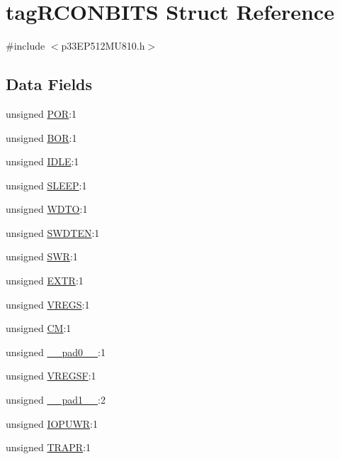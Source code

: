 \hypertarget{structtag_r_c_o_n_b_i_t_s}{}\section{tag\+R\+C\+O\+N\+B\+I\+TS Struct Reference}
\label{structtag_r_c_o_n_b_i_t_s}


{\ttfamily \#include $<$p33\+E\+P512\+M\+U810.\+h$>$}

\subsection*{Data Fields}
\begin{DoxyCompactItemize}
\item 
unsigned \hyperlink{structtag_r_c_o_n_b_i_t_s_ae99eb372a521d94f9df9f533ffa8a308}{P\+OR}\+:1
\item 
unsigned \hyperlink{structtag_r_c_o_n_b_i_t_s_afeb203c1042671be8f9582e0d3152b15}{B\+OR}\+:1
\item 
unsigned \hyperlink{structtag_r_c_o_n_b_i_t_s_abe9c5e7133050056afdce1c5cdf470cc}{I\+D\+LE}\+:1
\item 
unsigned \hyperlink{structtag_r_c_o_n_b_i_t_s_a9177ee67536822091725808bd8e80014}{S\+L\+E\+EP}\+:1
\item 
unsigned \hyperlink{structtag_r_c_o_n_b_i_t_s_a5698f00cd46c9f390b7bd90e441eab0c}{W\+D\+TO}\+:1
\item 
unsigned \hyperlink{structtag_r_c_o_n_b_i_t_s_ad336e4fd3e892bd5d33157de4abd75f4}{S\+W\+D\+T\+EN}\+:1
\item 
unsigned \hyperlink{structtag_r_c_o_n_b_i_t_s_aa9f213f01653d755c0eafd6a0ab848d3}{S\+WR}\+:1
\item 
unsigned \hyperlink{structtag_r_c_o_n_b_i_t_s_acd7d5c1d26c474898bda0b407876347a}{E\+X\+TR}\+:1
\item 
unsigned \hyperlink{structtag_r_c_o_n_b_i_t_s_acf721f1195338fc5901abd6e69edc2e1}{V\+R\+E\+GS}\+:1
\item 
unsigned \hyperlink{structtag_r_c_o_n_b_i_t_s_a0f69ed2f65fd91ba5109bc09fa02d8cf}{CM}\+:1
\item 
unsigned \hyperlink{structtag_r_c_o_n_b_i_t_s_adf71f3d8410c1f1dbbc96680a92c49af}{\+\_\+\+\_\+pad0\+\_\+\+\_\+}\+:1
\item 
unsigned \hyperlink{structtag_r_c_o_n_b_i_t_s_a467e9a0e3ce91cf31536ecb1d4b87bf3}{V\+R\+E\+G\+SF}\+:1
\item 
unsigned \hyperlink{structtag_r_c_o_n_b_i_t_s_acaf2d0924a107ec6e8d2e31febaf66f9}{\+\_\+\+\_\+pad1\+\_\+\+\_\+}\+:2
\item 
unsigned \hyperlink{structtag_r_c_o_n_b_i_t_s_afd207308cfa40af963365c79085f869e}{I\+O\+P\+U\+WR}\+:1
\item 
unsigned \hyperlink{structtag_r_c_o_n_b_i_t_s_ab694c171706318da24b476327a86900d}{T\+R\+A\+PR}\+:1
\end{DoxyCompactItemize}


